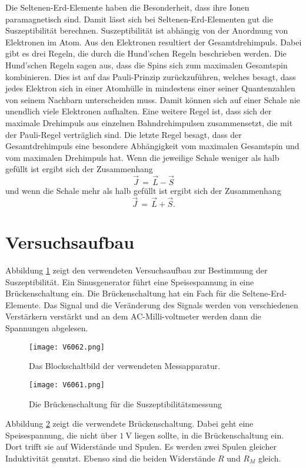 \documentclass[
  bibliography=totoc,     %
  captions=tableheading,  %
  titlepage=firstiscover, %
]{scrartcl}
\begin{document}
Die Seltenen-Erd-Elemente haben die Besonderheit, dass ihre Ionen paramagnetisch sind. Damit lässt sich bei Seltenen-Erd-Elementen gut die Suszeptibilität berechnen. Suszeptibilität ist abhängig von der Anordnung von Elektronen im Atom. Aus den Elektronen resultiert der Gesamtdrehimpuls. Dabei gibt es drei Regeln, die durch die Hund'schen Regeln beschrieben werden.
Die Hund'schen Regeln sagen aus, dass die Spins sich zum maximalen Gesamtspin kombinieren. Dies ist auf das Pauli-Prinzip zurückzuführen, welches besagt, dass jedes Elektron sich in einer Atomhülle in mindestens einer seiner Quantenzahlen von seinem Nachbarn unterscheiden muss. Damit können sich auf einer Schale nie unendlich viele Elektronen aufhalten. Eine weitere Regel ist, dass sich der maximale Drehimpuls aus einzelnen Bahndrehimpulsen zusammensetzt, die mit der Pauli-Regel verträglich sind. Die letzte Regel besagt, dass der Gesamtdrehimpuls eine besondere Abhängigkeit vom maximalen Gesamtspin und vom maximalen Drehimpuls hat. Wenn die jeweilige Schale weniger als halb gefüllt ist ergibt sich der Zusammenhang
\begin{equation*}
  \vec{J}\,=\,\vec{L}-\vec{S}
  \label{eqn:-}
\end{equation*}
und wenn die Schale mehr als halb gefüllt ist ergibt sich der Zusammenhang
\begin{equation}
  \vec{J}\,=\,\vec{L}+\vec{S}.
  \label{eqn:+}
\end{equation}
\section{Versuchsaufbau}
\label{sec:aufbau}
Abbildung \ref{fig:V6062} zeigt den verwendeten Versuchsaufbau zur Bestimmung
der Suszeptibilität. Ein Sinusgenerator führt eine Speisespannung in eine
Brückenschaltung ein. Die Brückenschaltung hat ein Fach für die
Seltene-Erd-Elemente. Das Signal und die Veränderung des Signals
werden von verschiedenen Verstärkern verstärkt und an dem AC-Milli-voltmeter
werden dann die Spannungen abgelesen.
\begin{figure}[H]
  \centering
  \texttt{[image: V6062.png]}
  \caption{Das Blockschaltbild der verwendeten Messapparatur. \cite{anleitung}}
  \label{fig:V6062}
\end{figure}
\noindent

\begin{figure}[H]
  \centering
  \texttt{[image: V6061.png]}
  \caption{Die Brückenschaltung für die Suszeptibilitätsmessung \cite{anleitung}}
  \label{fig:V6063}
\end{figure}
\noindent
Abbildung \ref{fig:V6063} zeigt die verwendete Brückenschaltung. Dabei geht
eine Speisespannung, die nicht über $\SI{1}{\volt}$ liegen sollte, in die
Brückenschaltung ein. Dort trifft sie auf Widerstände und Spulen. Es werden
zwei Spulen gleicher Induktivität genutzt. Ebenso sind die beiden Widerstände
$R$ und $R_M$ gleich.
\end{document}
